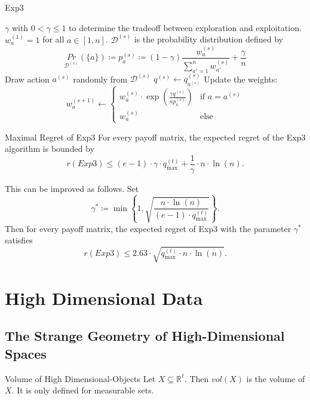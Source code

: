 \documentclass[english]{panikzettel}
\begin{document}
\begin{algo}{Exp3}
{
\renewcommand{\algorithmicrequire}{\textbf{Parameter:}}
\renewcommand{\algorithmicensure}{\textbf{Initialization:}}
\begin{algorithmic}[1]
 \Require $\gamma$ with $0<\gamma\leq 1$ to determine the tradeoff between exploration and exploitation.
 \Ensure $w_a^{(1)}=1$ for all $a\in[1,n]$.
   \State $\mathcal{D}^{(s)}$ is the probability distribution defined by
   \[
   \underset{\mathcal{D}^{(s)}}{Pr}(\{a\})\coloneqq p_a^{(s)}\coloneqq (1-\gamma)\frac{w_a^{(s)}}{\sum_{a'=1}^n w_{a'}^{(s)}}+\frac{\gamma}{n}
   \]
   \State Draw action $a^{(s)}$ randomly from $\mathcal{D}^{(s)}$
   \State $q^{(s)}\leftarrow q_{a^{(s)}}^{(s)}$ 
   \State Update the weights:
   \[
   w_a^{(s+1)}\leftarrow
   \begin{cases}
     w_a^{(s)}\cdot \exp\left(\frac{\gamma q^{(s)}}{n p_a^{(s)}}\right) & \text{if } a=a^{(s)}\\
     w_a^{(s)} & \text{else}
   \end{cases}
   \]
 \EndFor
\end{algorithmic}
}
\end{algo}

\begin{theo}{Maximal Regret of Exp3}
For every payoff matrix, the expected regret of the Exp3 algorithm is bounded by
\[
r(Exp3)\leq(e-1)\cdot \gamma\cdot q_{\max}^{(t)}+\frac{1}{\gamma}\cdot n \cdot \ln(n).
\]

This can be improved as follows. Set
\[
\gamma^*\coloneqq \min \left\lbrace 1, \sqrt{\frac{n\cdot \ln(n)}{(e-1)\cdot q_{\max}^{(t)}} } \right\rbrace.
\]
Then for every payoff matrix, the expected regret of Exp3 with the parameter $\gamma^*$ satisfies
\[
r(Exp3)\leq 2.63 \cdot \sqrt{q_{\max}^{(t)}\cdot n \cdot \ln(n)}.
\]
\end{theo}

\section{High Dimensional Data}
\subsection{The Strange Geometry of High-Dimensional Spaces}


\begin{defi}{Volume of High Dimensional-Objects}
	Let $X\subseteq \mathbb{R}^\ell$. Then $vol(X)$ is the volume of $X$.
	It is only defined for measurable sets.
\end{defi}
\end{document}
